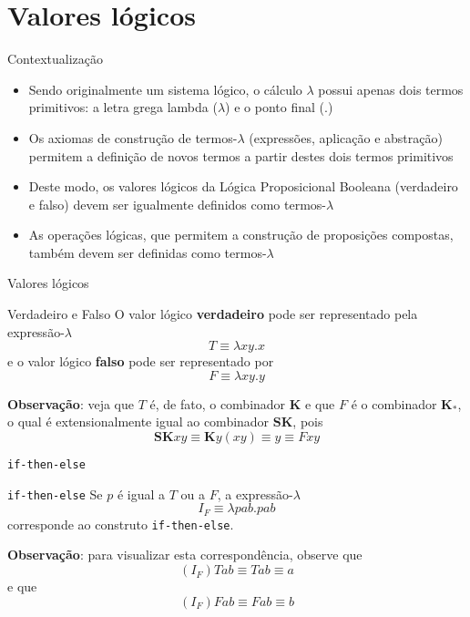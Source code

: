 \section{Valores lógicos}

\begin{frame}[fragile]{Contextualização}

    \begin{itemize}
        \item Sendo originalmente um sistema lógico, o cálculo $\lambda$ possui apenas
            dois termos primitivos: a letra grega lambda ($\lambda$) e o ponto final ($.$)

        \item Os axiomas de construção de termos-$\lambda$ (expressões, aplicação e abstração)
            permitem a definição de novos termos a partir destes dois termos primitivos

        \item Deste modo, os valores lógicos da Lógica Proposicional Booleana (verdadeiro e falso)
            devem ser igualmente definidos como termos-$\lambda$

        \item As operações lógicas, que permitem a construção de proposições compostas, também
            devem ser definidas como termos-$\lambda$
    \end{itemize}

\end{frame}

\begin{frame}[fragile]{Valores lógicos}

    \begin{block}{Verdadeiro e Falso}
        O valor lógico \textbf{verdadeiro} pode ser representado pela expressão-$\lambda$
        \[
            T \equiv \lambda xy.x
        \] e o valor lógico \textbf{falso} pode ser representado por
        \[
            F \equiv \lambda xy.y
        \]
    \end{block}

    \vspace{0.1in}

    \textbf{Observação}: veja que $T$ é, de fato, o combinador $\mathbf{K}$ e que $F$ é o 
    combinador $\mathbf{K_*}$, o qual é extensionalmente igual ao combinador $\mathbf{SK}$, pois
    \[
        \mathbf{SK}xy \equiv \mathbf{K}y(xy) \equiv y \equiv Fxy
    \]
\end{frame}

\begin{frame}[fragile]{\texttt{if-then-else}}

    \begin{block}{\texttt{if-then-else}}
        Se $p$ é igual a $T$ ou a $F$, a expressão-$\lambda$
        \[
            I_F \equiv \lambda pab.pab
        \]
        corresponde ao construto \texttt{if-then-else}. 
    \end{block}

    \vspace{0.1in}

    \textbf{Observação}: para visualizar esta correspondência, observe que
    \[
        (I_F) Tab \equiv Tab \equiv a
    \]
    e que
    \[
        (I_F) Fab \equiv Fab \equiv b
    \]
\end{frame}
